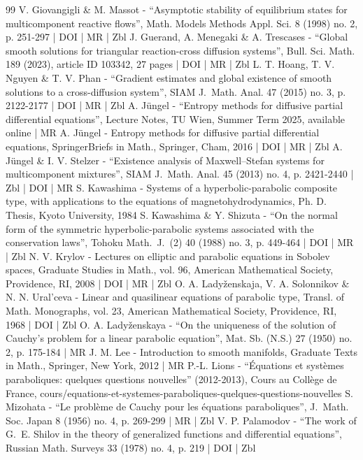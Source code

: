 \begin{thebibliography}{99}
V. Giovangigli \& M. Massot - “Asymptotic stability of equilibrium states for multicomponent reactive flows”, Math. Models Methods Appl. Sci. 8 (1998) no. 2, p. 251-297 | DOI | MR | Zbl
J. Guerand, A. Menegaki \& A. Trescases - “Global smooth solutions for triangular reaction-cross diffusion systems”, Bull. Sci. Math. 189 (2023), article ID 103342, 27 pages | DOI | MR | Zbl
L. T. Hoang, T. V. Nguyen \& T. V. Phan - “Gradient estimates and global existence of smooth solutions to a cross-diffusion system”, SIAM J. Math. Anal. 47 (2015) no. 3, p. 2122-2177 | DOI | MR | Zbl
A. Jüngel - “Entropy methods for diffusive partial differential equations”, Lecture Notes, TU Wien, Summer Term 2025, available online | MR
A. Jüngel - Entropy methods for diffusive partial differential equations, SpringerBriefs in Math., Springer, Cham, 2016 | DOI | MR | Zbl
A. Jüngel \& I. V. Stelzer - “Existence analysis of Maxwell–Stefan systems for multicomponent mixtures”, SIAM J. Math. Anal. 45 (2013) no. 4, p. 2421-2440 | Zbl | DOI | MR
S. Kawashima - Systems of a hyperbolic-parabolic composite type, with applications to the equations of magnetohydrodynamics, Ph. D. Thesis, Kyoto University, 1984
S. Kawashima \& Y. Shizuta - “On the normal form of the symmetric hyperbolic-parabolic systems associated with the conservation laws”, Tohoku Math. J. (2) 40 (1988) no. 3, p. 449-464 | DOI | MR | Zbl
N. V. Krylov - Lectures on elliptic and parabolic equations in Sobolev spaces, Graduate Studies in Math., vol. 96, American Mathematical Society, Providence, RI, 2008 | DOI | MR | Zbl
O. A. Ladyženskaja, V. A. Solonnikov \& N. N. Ural'ceva - Linear and quasilinear equations of parabolic type, Transl. of Math. Monographs, vol. 23, American Mathematical Society, Providence, RI, 1968 | DOI | Zbl
O. A. Ladyženskaya - “On the uniqueness of the solution of Cauchy’s problem for a linear parabolic equation”, Mat. Sb. (N.S.) 27 (1950) no. 2, p. 175-184 | MR
J. M. Lee - Introduction to smooth manifolds, Graduate Texts in Math., Springer, New York, 2012 | MR
P.-L. Lions - “Équations et systèmes paraboliques: quelques questions nouvelles” (2012-2013), Cours au Collège de France, cours/equations-et-systemes-paraboliques-quelques-questions-nouvelles
S. Mizohata - “Le problème de Cauchy pour les équations paraboliques”, J. Math. Soc. Japan 8 (1956) no. 4, p. 269-299 | MR | Zbl
V. P. Palamodov - “The work of G. E. Shilov in the theory of generalized functions and differential equations”, Russian Math. Surveys 33 (1978) no. 4, p. 219 | DOI | Zbl

\end{thebibliography}
